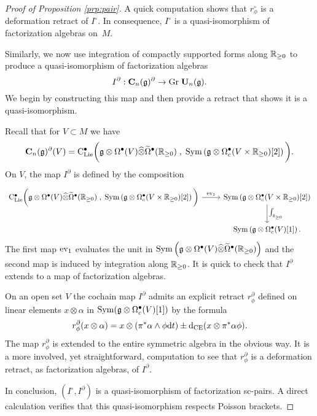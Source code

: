 \documentclass[11pt]{amsart}
\numberwithin{equation}{section}
\begin{document}
\begin{proof}[Proof of Proposition \ref{prp:pair}]
A quick computation shows that $r_\phi^\circ$ is a deformation retract of $I^\circ$.
In consequence, $I^\circ$ is a quasi-isomorphism of factorization algebras on~$M$.

Similarly, we now use integration of compactly supported forms along $\mathbb R_{\geq 0}$ to produce  a quasi-isomorphism of factorization algebras 
\[
I^\partial : \mathbf C_n(\mathfrak g)^\partial \to {\rm Gr} \; \mathbf U_n(\mathfrak g) .
\]
We begin by constructing this map and then provide a retract that shows it is a quasi-isomorphism.

Recall that for $V \subset M$ we have
\[
\mathbf C_n(\mathfrak g)^\partial (V) = {\rm C}_{\rm Lie}^\bullet\bigg(\mathfrak g \otimes \Omega^\bullet(V) \widehat{\otimes} \widetilde{\Omega}^\bullet(\mathbb R_{\geq 0})  \; , \; {\rm Sym}\left(\mathfrak g \otimes \Omega^\bullet_c (V \times \mathbb R_{\geq 0})[2] \right) \bigg) .
\]
On $V$, the map $I^\partial$ is defined by the composition
\[
\begin{tikzcd}
\clies\bigg(\fg \otimes \Omega^\bu(V) \Hat{\otimes} \Tilde{\Omega}^\bu(\RR_{\geq 0})  \; , \; \Sym\left(\fg \otimes \Omega^\bu_c (V \times \RR_{\geq 0})[2] \right) \bigg) \ar[r, "{{\rm ev}_1}"] & \Sym\left(\fg \otimes \Omega^\bu_c (V \times \RR_{\geq 0})[2] \right) \ar[d, "{\int_{\RR_{\geq 0}}}"] \\ &  \Sym\left(\fg \otimes \Omega^\bu_c (V)[1] \right) .
\end{tikzcd}
\]
The first map ${\rm ev}_1$ evaluates the unit in ${\rm Sym} \left(\mathfrak g \otimes \Omega^\bullet(V) \widehat{\otimes} \widetilde{\Omega}^\bullet(\mathbb R_{\geq 0})\right)$ and the second map is induced by integration along $\mathbb R_{\geq 0}$. 
It is quick to check that $I^{\partial}$ extends to a map of factorization algebras. 

On an open set $V$ the cochain map $I^{\partial}$ admits an explicit retract $r_\phi^\partial$ defined on linear elements $x \otimes \alpha$ in ${\rm Sym} (\mathfrak g \otimes \Omega^\bullet_c(V)[1])$ by the formula
\[
r_{\phi}^\partial (x \otimes \alpha) = x \otimes (\pi^* \alpha \wedge \phi {\rm d} t) \pm {\rm d}_{\rm CE} (x \otimes \pi^* \alpha \phi ) .
\]
The map $r_\phi^\partial$ is extended to the entire symmetric algebra in the obvious way. 
It is a more involved, yet straightforward, computation to see that $r^\partial_\phi$ is a deformation retract, as factorization algebras, of $I^\partial$. 

In conclusion, $(I^{\circ}, I^\partial)$ is a quasi-isomorphism of factorization sc-pairs. 
A direct calculation verifies that this quasi-isomorphism respects Poisson brackets. 
\end{proof}
\end{document}
